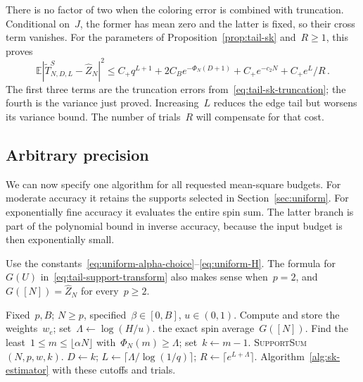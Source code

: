 \documentclass[10pt]{article}
\theoremstyle{plain}
\theoremstyle{definition}
\theoremstyle{remark}
\begin{document}
There is no factor of two when the coloring error is combined with truncation. Conditional on~$J$, the former has mean zero and the latter is fixed, so their cross term vanishes. For the parameters of Proposition~\ref{prop:tail-sk} and~$R\ge1$, this proves
\label{prop:sk-complete-error}
\begin{equation}\label{eq:sk-complete-error}
 \mathbb E|\widetilde T^S_{N,D,L}-\hat Z_N|^2
 \le C_+q^{L+1}+2C_Be^{-\Phi_N(D+1)}+C_+e^{-c_2N}+C_+e^L/R\,.
\end{equation}
The first three terms are the truncation errors from~\eqref{eq:tail-sk-truncation}; the fourth is the variance just proved. Increasing~$L$ reduces the edge tail but worsens its variance bound. The number of trials~$R$ will compensate for that cost.

\subsection{Arbitrary precision}
We can now specify one algorithm for all requested mean-square budgets. For moderate accuracy it retains the supports selected in Section~\ref{sec:uniform}. For exponentially fine accuracy it evaluates the entire spin sum. The latter branch is part of the polynomial bound in inverse accuracy, because the input budget is then exponentially small.

Use the constants~\eqref{eq:uniform-alpha-choice}--\eqref{eq:uniform-H}. The formula for~$G(U)$ in~\eqref{eq:tail-support-transform} also makes sense when~$p=2$, and~$G([N])=\hat Z_N$ for every~$p\ge2$.

\begin{algorithm}[htbp]
\caption{\textsc{GraphApprox}$(N,\beta,J,u)$}\label{alg:graphapprox}
\begin{algorithmic}[1]
\Require Fixed~$p,B$; $N\ge p$, specified~$\beta\in[0,B]$, $u\in(0,1)$.
\State Compute and store the weights~$w_e$; set~$\Lambda\gets\log(H/u)$.
 \State \Return the exact spin average~$G([N])$.
\EndIf
\State Find the least~$1\le m\le\lfloor\alpha N\rfloor$ with~$\Phi_N(m)\ge\Lambda$; set~$k\gets m-1$.
 \State \Return \textsc{SupportSum}$(N,p,w,k)$.
\Else
 \State $D\gets k$; $L\gets\lceil\Lambda/\log(1/q)\rceil$; $R\gets\lceil e^{L+\Lambda}\rceil$.
 \State \Return Algorithm~\ref{alg:sk-estimator} with these cutoffs and trials.
\EndIf
\end{algorithmic}
\end{algorithm}
\end{document}

